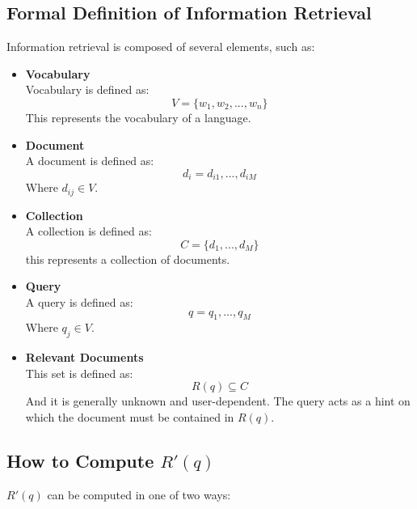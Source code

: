\documentclass{article}
\begin{document}
\subsection{Formal Definition of Information Retrieval}
Information retrieval is composed of several elements, such as:

\begin{itemize}
	\item \textbf{Vocabulary}
	\vspace{.2cm} \\
	Vocabulary is defined as:
	\[ V = \{ w_1, w_2, ..., w_n \} \]
	This represents the vocabulary of a language.
	
	\item \textbf{Document}
	\vspace{.2cm} \\
	A document is defined as:
	\[ d_i = d_{i1}, ..., d_{iM} \]
	Where $d_{ij} \in V$.
	
	\item \textbf{Collection}
	\vspace{.2cm} \\
	A collection is defined as:
	\[ C = \{d_1, ..., d_M\} \]
	this represents a collection of documents.
	
	\item \textbf{Query}
	\vspace{.2cm} \\
	A query is defined as:
	\[ q = q_1, ..., q_M \]
	Where $q_j \in V$.
	
	\item \textbf{Relevant Documents}
	\vspace{.2cm} \\
	This set is defined as:
	\[ R(q) \subseteq C \]
	And it is generally unknown and user-dependent. The query acts as a hint on which the document must be contained in $R(q)$.
\end{itemize}

\subsection{How to Compute $R'(q)$}
$R'(q)$ can be computed in one of two ways:
\end{document}
